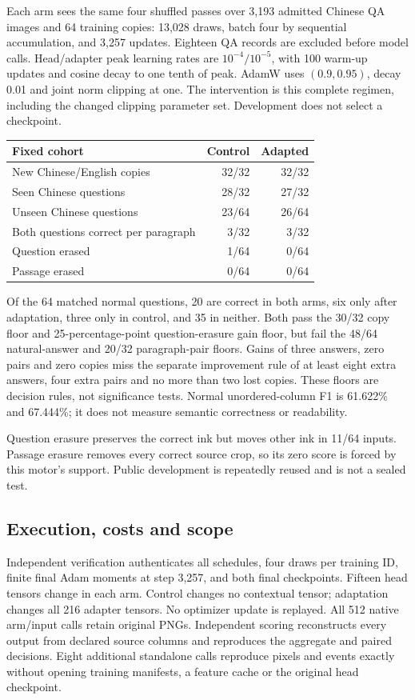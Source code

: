 \documentclass[10pt,a4paper]{article}
\begin{document}
Each arm sees the same four shuffled passes over 3,193 admitted Chinese QA
images and 64 training copies: 13,028 draws, batch four by sequential
accumulation, and 3,257 updates. Eighteen QA records are excluded before model
calls. Head/adapter peak learning rates are $10^{-4}/10^{-5}$, with 100
warm-up updates and cosine decay to one tenth of peak. AdamW uses
$(0.9,0.95)$, decay 0.01 and joint norm clipping at one. The intervention is
this complete regimen, including the changed clipping parameter set.
Development does not select a checkpoint.

\begin{center}\small
\begin{tabular}{lrr}
\toprule
Fixed cohort & Control & Adapted\\
\midrule
New Chinese/English copies & 32/32 & 32/32\\
Seen Chinese questions & 28/32 & 27/32\\
Unseen Chinese questions & 23/64 & 26/64\\
Both questions correct per paragraph & 3/32 & 3/32\\
Question erased & 1/64 & 0/64\\
Passage erased & 0/64 & 0/64\\
\bottomrule
\end{tabular}
\end{center}
Of the 64 matched normal questions, 20 are correct in both arms, six only
after adaptation, three only in control, and 35 in neither. Both pass the
30/32 copy floor and 25-percentage-point question-erasure gain floor, but
fail the 48/64 natural-answer and 20/32 paragraph-pair floors. Gains of
three answers, zero pairs and zero copies miss the separate improvement
rule of at least eight extra answers, four extra pairs and no more than
two lost copies. These floors are decision rules, not significance tests.
Normal unordered-column F1 is 61.622\% and 67.444\%; it does not measure
semantic correctness or readability.

Question erasure preserves the correct ink but moves other ink in 11/64
inputs. Passage erasure removes every correct source crop, so its zero
score is forced by this motor's support. Public development is repeatedly
reused and is not a sealed test.

\subsection*{Execution, costs and scope}
Independent verification authenticates all schedules, four draws per
training ID, finite final Adam moments at step 3,257, and both final
checkpoints. Fifteen head tensors change in each arm. Control changes no
contextual tensor; adaptation changes all 216 adapter tensors. No optimizer
update is replayed. All 512 native arm/input calls retain original PNGs.
Independent scoring reconstructs every output from declared source columns
and reproduces the aggregate and paired decisions. Eight additional
standalone calls reproduce pixels and events exactly without opening
training manifests, a feature cache or the original head checkpoint.
\end{document}
